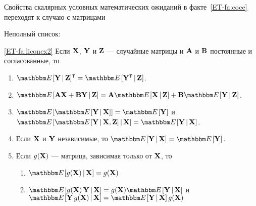 \begin{frame}

    \vspace{2em}
    Свойства скалярных условных математических ожиданий в факте~\ref{ET-fa:coce} переходят к случаю с матрицами
    
    Неполный список:

    \Fact
    \eqref{ET-fa:liconex2}
    Если $\mathbf X$, $\mathbf Y$ и $\mathbf Z$ --- случайные матрицы и 
    $\mathbf A$ и $\mathbf B$ постоянные и согласованные, то
    \begin{enumerate}
        \item $\EE [ \boldY \given \boldZ ]^\T = \EE [ \boldY^\T \given \boldZ ]$. 
        \item $\EE [ \boldA \boldX + \boldB \boldY \given \boldZ ] = 
             \boldA \EE[\boldX \given \boldZ ] + \boldB \EE[ \boldY \given \boldZ  ]$.
        \item $\EE [\EE [ \boldY \given \boldX ] ] = \EE[\boldY]$ и 
            $\EE [\EE [ \boldY \given \boldX, \boldZ ] \given \boldX ] =
            \EE[\boldY \given \boldX]$.
        \item Если $\mathbf X$ и $\mathbf Y$ независимые, то $\EE [ \boldY \given \boldX
            ]  = \EE[\boldY]$.
        \item Если $g(\mathbf X)$ --- матрица, зависимая только от $\mathbf X$, то 
            \begin{enumerate}
                \item $\EE [ g(\boldX) \given \boldX ] = g(\boldX)$
                \item $\EE [ g(\boldX) \, \boldY \given \boldX ] = g(\boldX) \EE [
                    \boldY \given \boldX ]$ и $\EE [ \boldY \, g(\boldX) \given \boldX ] = \EE [
                    \boldY \given \boldX] \, g(\boldX)$
            \end{enumerate}
    \end{enumerate}
    
\end{frame}
    
    

